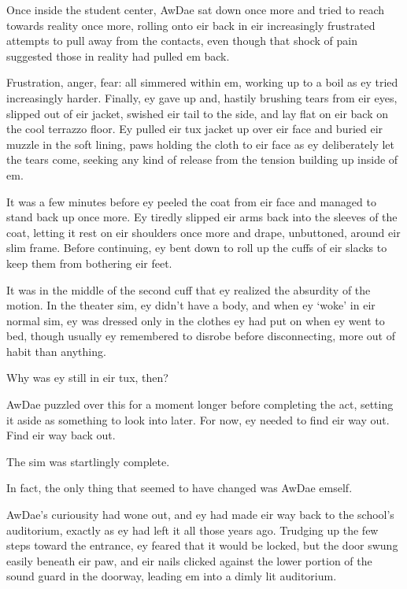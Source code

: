 Once inside the student center, AwDae sat down once more and tried to reach towards reality once more, rolling onto eir back in eir increasingly frustrated attempts to pull away from the contacts, even though that shock of pain suggested those in reality had pulled em back.

Frustration, anger, fear: all simmered within em, working up to a boil as ey tried increasingly harder.  Finally, ey gave up and, hastily brushing tears from eir eyes, slipped out of eir jacket, swished eir tail to the side, and lay flat on eir back on the cool terrazzo floor.  Ey pulled eir tux jacket up over eir face and buried eir muzzle in the soft lining, paws holding the cloth to eir face as ey deliberately let the tears come, seeking any kind of release from the tension building up inside of em.

It was a few minutes before ey peeled the coat from eir face and managed to stand back up once more.  Ey tiredly slipped eir arms back into the sleeves of the coat, letting it rest on eir shoulders once more and drape, unbuttoned, around eir slim frame.  Before continuing, ey bent down to roll up the cuffs of eir slacks to keep them from bothering eir feet.

It was in the middle of the second cuff that ey realized the absurdity of the motion.  In the theater sim, ey didn't have a body, and when ey `woke' in eir normal sim, ey was dressed only in the clothes ey had put on when ey went to bed, though usually ey remembered to disrobe before disconnecting, more out of habit than anything.

Why was ey still in eir tux, then?

AwDae puzzled over this for a moment longer before completing the act, setting it aside as something to look into later.  For now, ey needed to find eir way out.  Find eir way back out.

\secdiv

The sim was startlingly complete.

In fact, the only thing that seemed to have changed was AwDae emself.

AwDae's curiousity had wone out, and ey had made eir way back to the school's auditorium, exactly as ey had left it all those years ago.  Trudging up the few steps toward the entrance, ey feared that it would be locked, but the door swung easily beneath eir paw, and eir nails clicked against the lower portion of the sound guard in the doorway, leading em into a dimly lit auditorium.

